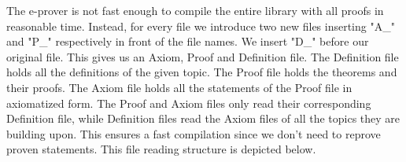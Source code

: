 \documentclass[11pt]{article}
\begin{document}
\begin{figure}[h]
\begin{center}
\end{center}
\end{figure}

\newpage

The e-prover is not fast enough to compile the entire library with all proofs in reasonable time. 
Instead, for every file we introduce two new files inserting "A\_" and "P\_" respectively in front of the file names. We insert "D\_" before our original file. This gives us an Axiom, Proof and Definition file. 
The Definition file holds all the definitions of the given topic. 
The Proof file holds the theorems and their proofs. The Axiom file holds all the statements of the Proof file in axiomatized form. 
The Proof and Axiom files only read their corresponding Definition file, while Definition files read the Axiom files of all the topics they are building upon. 
This ensures a fast compilation since we don't need to reprove proven statements. 
This file reading structure is depicted below.
\end{document}
